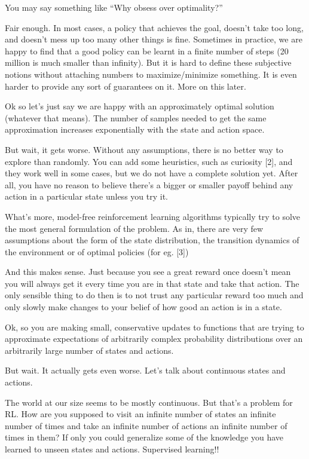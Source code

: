 You may say something like “Why obsess over optimality?”

Fair enough. In most cases, a policy that achieves the goal, doesn’t take too long, and doesn’t mess up too many other things is fine. Sometimes in practice, we are happy to find that a good policy can be learnt in a finite number of steps (20 million is much smaller than infinity). But it is hard to define these subjective notions without attaching numbers to maximize/minimize something. It is even harder to provide any sort of guarantees on it. More on this later.

Ok so let’s just say we are happy with an approximately optimal solution (whatever that means). The number of samples needed to get the same approximation increases exponentially with the state and action space.

But wait, it gets worse.
Without any assumptions, there is no better way to explore than randomly. You can add some heuristics, such as curiosity [2], and they work well in some cases, but we do not have a complete solution yet. After all, you have no reason to believe there’s a bigger or smaller payoff behind any action in a particular state unless you try it.

What’s more, model-free reinforcement learning algorithms typically try to solve the most general formulation of the problem. As in, there are very few assumptions about the form of the state distribution, the transition dynamics of the environment or of optimal policies (for eg. [3])

And this makes sense. Just because you see a great reward once doesn’t mean you will always get it every time you are in that state and take that action. The only sensible thing to do then is to not trust any particular reward too much and only slowly make changes to your belief of how good an action is in a state.

Ok, so you are making small, conservative updates to functions that are trying to approximate expectations of arbitrarily complex probability distributions over an arbitrarily large number of states and actions.

But wait. It actually gets even worse.
Let’s talk about continuous states and actions.

The world at our size seems to be mostly continuous. But that’s a problem for RL. How are you supposed to visit an infinite number of states an infinite number of times and take an infinite number of actions an infinite number of times in them? If only you could generalize some of the knowledge you have learned to unseen states and actions. Supervised learning!!

